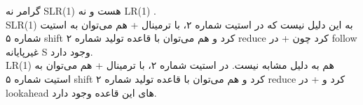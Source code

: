 گرامر نه SLR(1) هست و نه LR(1)‌ .
\\
SLR(1)
به این دلیل نیست که در استیت شماره ۲، با ترمینال + هم می‌توان به استیت شماره ۵ shift کرد و هم می‌توان با قاعده تولید شماره ۲ reduce کرد چون + در follow غیرپایانه S وجود دارد.
\\
LR(1) 
هم به دلیل مشابه نیست. در استیت شماره ۲، با ترمینال + هم می‌توان به استیت شماره ۵ shift کرد و هم می‌توان‌ با قاعده تولید شماره ۲ reduce کرد و + در lookahead های این قاعده وجود دارد.
